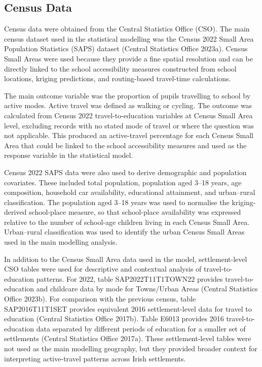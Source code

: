 \documentclass{article}
\begin{document}
\subsection{Census Data}\label{census-data}

Census data were obtained from the Central Statistics Office (CSO). The
main census dataset used in the statistical modelling was the Census
2022 Small Area Population Statistics (SAPS) dataset (Central Statistics
Office 2023a). Census Small Areas were used because they provide a fine
spatial resolution and can be directly linked to the school
accessibility measures constructed from school locations, kriging
predictions, and routing-based travel-time calculations.

The main outcome variable was the proportion of pupils travelling to
school by active modes. Active travel was defined as walking or cycling.
The outcome was calculated from Census 2022 travel-to-education
variables at Census Small Area level, excluding records with no stated
mode of travel or where the question was not applicable. This produced
an active-travel percentage for each Census Small Area that could be
linked to the school accessibility measures and used as the response
variable in the statistical model.

Census 2022 SAPS data were also used to derive demographic and
population covariates. These included total population, population aged
3--18 years, age composition, household car availability, educational
attainment, and urban--rural classification. The population aged 3--18
years was used to normalise the kriging-derived school-place measure, so
that school-place availability was expressed relative to the number of
school-age children living in each Census Small Area. Urban--rural
classification was used to identify the urban Census Small Areas used in
the main modelling analysis.

In addition to the Census Small Area data used in the model,
settlement-level CSO tables were used for descriptive and contextual
analysis of travel-to-education patterns. For 2022, table
SAP2022T11T1TOWN22 provides travel-to-education and childcare data by
mode for Towns/Urban Areas (Central Statistics Office 2023b). For
comparison with the previous census, table SAP2016T11T1SET provides
equivalent 2016 settlement-level data for travel to education (Central
Statistics Office 2017b). Table E6013 provides 2016 travel-to-education
data separated by different periods of education for a smaller set of
settlements (Central Statistics Office 2017a). These settlement-level
tables were not used as the main modelling geography, but they provided
broader context for interpreting active-travel patterns across Irish
settlements.
\end{document}
